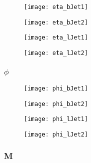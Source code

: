 				\begin{figure}[h]
					\centering
					
					\begin{minipage}[h]{0.33\linewidth}
						\texttt{[image: eta\_bJet1]}
					\end{minipage}
					\quad
					\begin{minipage}[h]{0.33\linewidth}
						\texttt{[image: eta\_bJet2]}
					\end{minipage}
					
					\begin{minipage}[h]{0.33\linewidth}
						\texttt{[image: eta\_lJet1]}
					\end{minipage}
					\quad
					\begin{minipage}[h]{0.33\linewidth}
						\texttt{[image: eta\_lJet2]}
					\end{minipage}
					\label{fig:kin:eta2c4j}
				\end{figure}
				
		\subsubsection{$\phi$}
		
		\begin{figure}[h]
			\centering
			
			\begin{minipage}[h]{0.33\linewidth}
				\texttt{[image: phi\_bJet1]}
			\end{minipage}
			\quad
			\begin{minipage}[h]{0.33\linewidth}
				\texttt{[image: phi\_bJet2]}
			\end{minipage}
			
			\begin{minipage}[h]{0.33\linewidth}
				\texttt{[image: phi\_lJet1]}
			\end{minipage}
			\quad
			\begin{minipage}[h]{0.33\linewidth}
				\texttt{[image: phi\_lJet2]}
			\end{minipage}
			\label{fig:kin:phi2c4j}
		\end{figure}
		
				\subsubsection{M}
				
